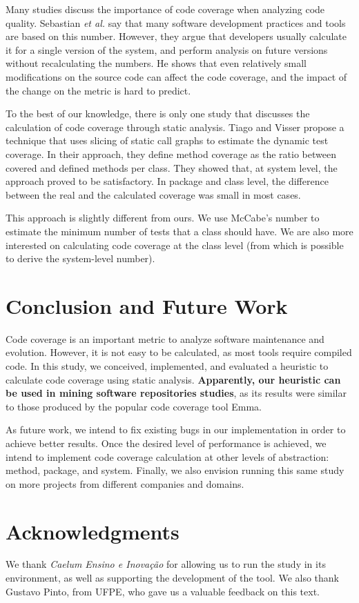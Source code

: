 \documentclass{sig-alternate}
\begin{document}
Many studies discuss the importance of code coverage when analyzing code quality. 
Sebastian \textit{et al.} \cite{sebastian} say that many software development practices and tools
are based on this number. However, they argue that developers usually calculate it for a single
version of the system, and perform analysis on future versions without recalculating the numbers.
He shows that even relatively small modifications on the source code can affect the code coverage, 
and the impact of the change on the metric is hard to predict.

To the best of our knowledge, there is only one study that discusses the calculation of
code coverage through static analysis. Tiago and Visser \cite{tiago} propose a
technique that uses slicing of static call graphs to estimate the
dynamic test coverage. 
In their approach, they define method coverage as the ratio between covered 
and defined methods per class. They showed that, at system level, the approach
proved to be satisfactory. In package and class level, the difference between
the real and the calculated coverage was small in most cases.

This approach is slightly different from ours. We use McCabe's number to estimate the
minimum number of tests that a class should have. We are also more interested on calculating
code coverage at the class level (from which is possible to derive the system-level number). 

\section{Conclusion and Future Work}
\label{sec-conclusion}

Code coverage is an important metric to analyze software maintenance and evolution. However, it is 
not easy to be calculated, as most tools require compiled code. In this study, we conceived, implemented, 
and evaluated a heuristic to calculate code coverage using static analysis. 
\textbf{Apparently, our heuristic can be used in mining software repositories studies}, 
as its results were similar to those produced by the popular code coverage tool Emma. 

As future work, we intend to fix existing bugs in our implementation in order to
achieve better results. Once the desired level of performance is achieved, we intend to implement code coverage
calculation at other levels of abstraction: method, package, and system. Finally, we also 
envision running this same study on more projects from different companies and domains.


\section{Acknowledgments}

We thank \textit{Caelum Ensino e Inovação} for allowing us to run the study in its environment,
as well as supporting the development of the tool. We also thank Gustavo Pinto, from UFPE, who
gave us a valuable feedback on this text.



\end{document}
